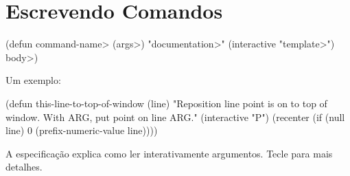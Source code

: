 \section{Escrevendo Comandos}

\beginexample%
(defun \<command-name> (\<args>)
  "\<documentation>" (interactive "\<template>")
  \<body>)
\endexample

Um exemplo:

\beginexample%
(defun this-line-to-top-of-window (line)
  "Reposition line point is on to top of window.
With ARG, put point on line ARG."
  (interactive "P")
  (recenter (if (null line)
                0
              (prefix-numeric-value line))))
\endexample

A especifica{\c{c}}{\~a}o  explica como ler
interativamente argumentos.  Tecle  para mais
detalhes.

\copyrightnotice

\bye


